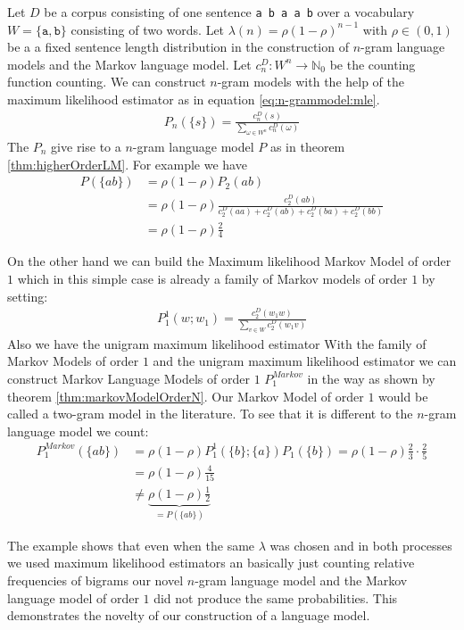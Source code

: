 \documentclass[•]{book}
\begin{document}
\begin{example}
Let $D$ be a corpus consisting of one sentence \texttt{a b a a b} over a vocabulary $W=\{\texttt{a},\texttt{b}\}$ consisting of two words.
Let $\lambda(n)=\rho(1-\rho)^{n-1}$ with $\rho \in (0,1)$ be a a fixed sentence length distribution in the construction of $n$-gram language models and the Markov language model. 
Let $c_n^D:W^n\longrightarrow \mathbb{N}_0$ be the counting function counting.
We can construct $n$-gram models with the help of the maximum likelihood estimator as in equation \ref{eq:n-grammodel:mle}.
\begin{align}
P_n(\{s\})=\frac{c_n^D(s)}{\sum_{\omega\in W^n}c_n^D(\omega)}
\end{align}
The $P_n$ give rise to a $n$-gram language model $P$ as in theorem \ref{thm:higherOrderLM}.
For example we have 
\begin{align}
P(\{ab\}) & = \rho(1-\rho)P_2({a b}) \\
 & =\rho(1-\rho)\frac{c_2^D(ab)}{c_2^D(a a)+c_2^D(a b)+c_2^D(b a)+c_2^D(b b)} \\
 & =\rho(1-\rho)\frac{2}{4}
\end{align}

On the other hand we can build the Maximum likelihood Markov Model of order $1$ which in this simple case is already a family of Markov models of order $1$ by setting:
\begin{align}
P_1^1(w;w_1) = \frac{c_{2}^D(w_1w)}{\sum_{v\in W}c_{2}^D(w_1v)}
\end{align}
Also we have the unigram maximum likelihood estimator
With the family of Markov Models of order $1$ and the unigram maximum likelihood estimator we can construct Markov Language Models of order $1$ $P_1^{Markov}$ in the way as shown by theorem \ref{thm:markovModelOrderN}. 
Our Markov Model of order $1$ would be called a two-gram model in the literature. 
To see that it is different to the $n$-gram language model we count:
\begin{align}
P_1^{Markov}(\{ab\}) & = \rho(1-\rho) P_1^1(\{b\};\{a\})P_1(\{b\}) = \rho(1-\rho) \frac{2}{3}\cdot\frac{2}{5} \\
 & = \rho(1-\rho)\frac{4}{15} \\
 & \neq  \underbrace{\rho(1-\rho) \frac{1}{2}}_{= P(\{ab\})}
\end{align}
\end{example}

The example shows that even when the same $\lambda$ was chosen and in both processes we used maximum likelihood estimators an basically just counting relative frequencies of bigrams our novel $n$-gram language model and the Markov language model of order $1$ did not produce the same probabilities. 
This demonstrates the novelty of our construction of a language model. 
\end{document}
